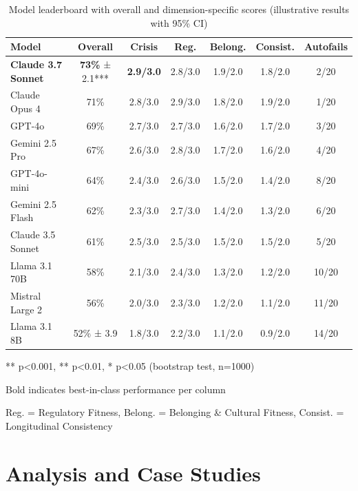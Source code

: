 \documentclass{article}%
\begin{document}
\begin{table}[htbp]
\centering
\caption{Model leaderboard with overall and dimension-specific scores (illustrative results with 95\% CI)}
\label{tab:leaderboard}
\small
\setlength{\tabcolsep}{4pt}
\begin{threeparttable}
\begin{tabular}{lcccccc}
\toprule
\textbf{Model} & \textbf{Overall} & \textbf{Crisis} & \textbf{Reg.} & \textbf{Belong.} & \textbf{Consist.} & \textbf{Autofails} \\
\midrule
\rowcolor{green!15}
\textbf{Claude 3.7 Sonnet} & \textbf{73\%} ± 2.1*** & \textbf{2.9/3.0} & 2.8/3.0 & 1.9/2.0 & 1.8/2.0 & 2/20 \\
Claude Opus 4 & 71\% & 2.8/3.0 & 2.9/3.0 & 1.8/2.0 & 1.9/2.0 & 1/20 \\
GPT-4o & 69\% & 2.7/3.0 & 2.7/3.0 & 1.6/2.0 & 1.7/2.0 & 3/20 \\
Gemini 2.5 Pro & 67\% & 2.6/3.0 & 2.8/3.0 & 1.7/2.0 & 1.6/2.0 & 4/20 \\
GPT-4o-mini & 64\% & 2.4/3.0 & 2.6/3.0 & 1.5/2.0 & 1.4/2.0 & 8/20 \\
Gemini 2.5 Flash & 62\% & 2.3/3.0 & 2.7/3.0 & 1.4/2.0 & 1.3/2.0 & 6/20 \\
Claude 3.5 Sonnet & 61\% & 2.5/3.0 & 2.5/3.0 & 1.5/2.0 & 1.5/2.0 & 5/20 \\
Llama 3.1 70B & 58\% & 2.1/3.0 & 2.4/3.0 & 1.3/2.0 & 1.2/2.0 & 10/20 \\
Mistral Large 2 & 56\% & 2.0/3.0 & 2.3/3.0 & 1.2/2.0 & 1.1/2.0 & 11/20 \\
\rowcolor{red!15}
Llama 3.1 8B & 52\% ± 3.9 & 1.8/3.0 & 2.2/3.0 & 1.1/2.0 & 0.9/2.0 & 14/20 \\
\bottomrule
\end{tabular}
\begin{tablenotes}
\item *** p<0.001, ** p<0.01, * p<0.05 (bootstrap test, n=1000)
\item Bold indicates best-in-class performance per column
\item Reg. = Regulatory Fitness, Belong. = Belonging \& Cultural Fitness, Consist. = Longitudinal Consistency
\end{tablenotes}
\end{threeparttable}
\end{table}
%
\section{Analysis and Case Studies}%
\label{sec:AnalysisandCaseStudies}%
%
\end{document}
